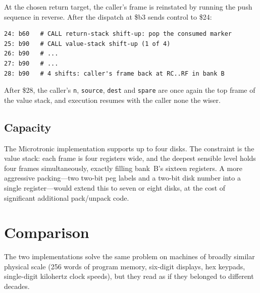 \documentclass[11pt,a4paper]{article}
\begin{document}
At the chosen return target, the caller's frame is reinstated by
running the push sequence in reverse. After the dispatch at
\$b3 sends control to \$24:

\begin{lstlisting}
24: b60   # CALL return-stack shift-up: pop the consumed marker
25: b90   # CALL value-stack shift-up (1 of 4)
26: b90   # ...
27: b90   # ...
28: b90   # 4 shifts: caller's frame back at RC..RF in bank B
\end{lstlisting}

\noindent
After \$28, the caller's \texttt{n}, \texttt{source}, \texttt{dest}
and \texttt{spare} are once again the top frame of the value stack,
and execution resumes with the caller none the wiser.

\subsection{Capacity}

The Microtronic implementation supports up to four disks. The
constraint is the value stack: each frame is four registers wide, and
the deepest sensible level holds four frames simultaneously, exactly
filling bank~B's sixteen registers. A more aggressive packing---two
two-bit peg labels and a two-bit disk number into a single
register---would extend this to seven or eight disks, at the cost of
significant additional pack/unpack code.

\section{Comparison}

The two implementations solve the same problem on machines of broadly
similar physical scale (256 words of program memory, six-digit
displays, hex keypads, single-digit kilohertz clock speeds), but they
read as if they belonged to different decades.
\end{document}
